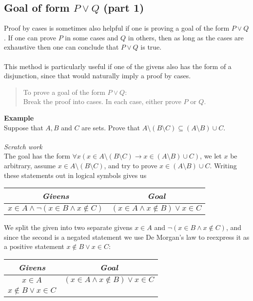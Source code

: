 \documentclass{report}
\theoremstyle{definition}
\begin{document}
\subsection{Goal of form $P\lor Q$ (part 1)}
Proof by cases is sometimes also helpful if one is proving a goal of the form $P\lor Q$. If one can
prove $P$ in some cases and $Q$ in others, then as long as the cases are exhaustive then one 
can conclude that $P\lor Q$ is true.\\
\vspace{1mm}\\
This method is particularly useful if one of the givens also has the form of a disjunction, since that would naturally imply a proof by cases.
\begin{quote}
To prove a goal of the form $P\lor Q$:\\
Break the proof into cases. In each case, either prove $P$ or $Q$.
\end{quote}
\textbf{Example}\\
Suppose that $A,B$ and $C$ are sets. Prove that $A\setminus(B\setminus C)\subseteq(A\setminus B)\cup C$.\\
\vspace{1mm}\\
\textit{Scratch work}\\
The goal has the form $\forall x(x\in A\setminus(B\setminus C)\to x\in(A\setminus B)\cup C)$, we let $x$ be arbitrary, assume $x\in A\setminus(B\setminus C)$, and try to prove 
$x\in(A\setminus B)\cup C$. Writing these statements out in logical symbols gives us
\begin{center}
\begin{tabular}{c|c}
\textit{Givens}&\textit{Goal}\\
\hline
$x\in A\land\neg(x\in B\land x\notin C)$&$(x\in A\land x\notin B)\lor x\in C$
\end{tabular}
\end{center}
We split the given into two separate givens $x\in A$ and $\neg(x\in B\land x\notin C)$, and since the second is a negated statement we use De Morgan's law to reexpress it as a positive statement 
$x\notin B\lor x\in C$:
\begin{center}
\begin{tabular}{c|c}
\textit{Givens}&\textit{Goal}\\
\hline
$x\in A$&$(x\in A\land x\notin B)\lor x\in C$\\
$x\notin B\lor x\in C$&
\end{tabular}
\end{center}
\end{document}
